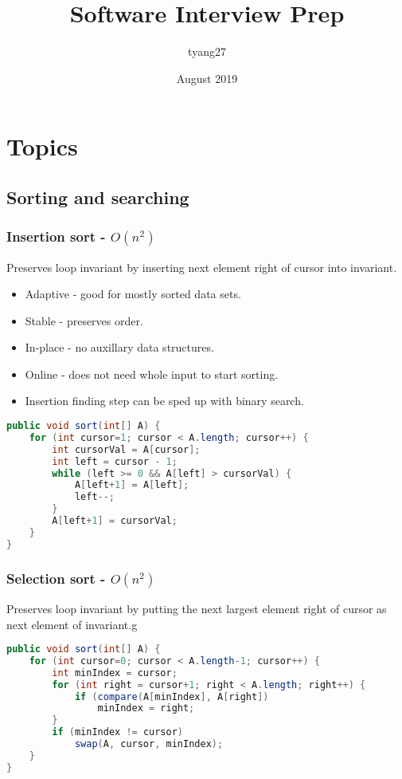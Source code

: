 \documentclass[10pt]{article}
\title{Software Interview Prep}
\author{tyang27}
\date{August 2019}
\begin{document}

\section{Topics}
\subsection{Sorting and searching}
\subsubsection{Insertion sort - $O(n^2)$}
Preserves loop invariant by inserting next element right of cursor into invariant.
\begin{itemize}
    \item Adaptive - good for mostly sorted data sets.
    \item Stable - preserves order.
    \item In-place - no auxillary data structures.
    \item Online - does not need whole input to start sorting.
    \item Insertion finding step can be sped up with binary search.
\end{itemize}
\begin{lstlisting}[language=java]
public void sort(int[] A) {
    for (int cursor=1; cursor < A.length; cursor++) {
        int cursorVal = A[cursor];
        int left = cursor - 1;
        while (left >= 0 && A[left] > cursorVal) {
            A[left+1] = A[left];
            left--;
        }
        A[left+1] = cursorVal;
    }
}
\end{lstlisting}

\subsubsection{Selection sort - $O(n^2)$}
Preserves loop invariant by putting the next largest element right of cursor as next element of invariant.g
\begin{lstlisting}[language=java]
public void sort(int[] A) {
    for (int cursor=0; cursor < A.length-1; cursor++) {
        int minIndex = cursor;
        for (int right = cursor+1; right < A.length; right++) {
            if (compare(A[minIndex], A[right])
                minIndex = right;
        }
        if (minIndex != cursor)
            swap(A, cursor, minIndex);
    }
}
\end{lstlisting}
\end{document}
